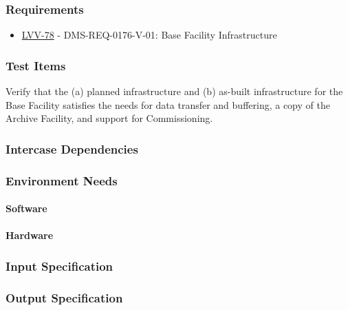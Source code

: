 \subsubsection{Requirements}
\begin{itemize}
\item \href{https://jira.lsstcorp.org/browse/LVV-78}{LVV-78} - DMS-REQ-0176-V-01: Base Facility Infrastructure
\end{itemize}

\subsubsection{Test Items}
Verify that the (a) planned infrastructure and (b) as-built
infrastructure for the Base Facility satisfies the needs for data
transfer and buffering, a copy of the Archive Facility, and support for
Commissioning.



\subsubsection{Intercase Dependencies}

\subsubsection{Environment Needs}

\paragraph{Software}

\paragraph{Hardware}

\subsubsection{Input Specification}

\subsubsection{Output Specification}


